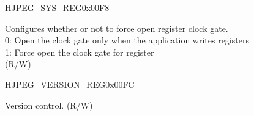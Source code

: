 \begin{register}{H}{JPEG\_SYS\_REG}{0x00F8}\label{regdesc:JPEGSYSREG}
%
%
\regnewline%
\begin{regdesc}\begin{reglist}
\label{fielddesc:JPEGCLKEN}\item [JPEG\_CLK\_EN] Configures whether or not to force open register clock gate.\\
0: Open the clock gate only when the application writes registers\\
1: Force open the clock gate for register\\
(R/W)
\end{reglist}\end{regdesc}
\end{register}


\begin{register}{H}{JPEG\_VERSION\_REG}{0x00FC}\label{regdesc:JPEGVERSIONREG}
%
%
\regnewline%
\begin{regdesc}\begin{reglist}
\label{fielddesc:JPEGJPEGVER}\item [JPEG\_JPEG\_VER] Version control. (R/W)
\end{reglist}\end{regdesc}
\end{register}

